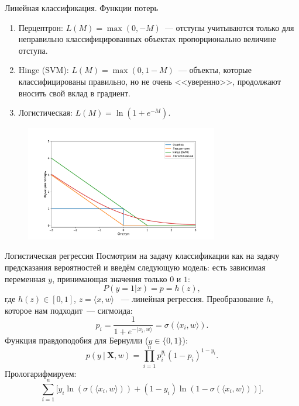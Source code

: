\documentclass[notheorems, handout]{beamer}
\begin{document}
\begin{frame}{Линейная классификация. Функции потерь}
	\begin{enumerate}
		\item Перцептрон: $L(M) = \max(0, -M)$~--- отступы учитываются только для неправильно классифицированных объектах пропорционально величине отступа.
		\item Hinge (SVM): $L(M) = \max(0, 1-M)$~--- объекты, которые классифицированы правильно, но не очень <<уверенно>>, продолжают вносить свой вклад в градиент.
		\item Логистическая: $L(M) = \ln\left(1+e^{-M}\right)$.
	\end{enumerate}
	\begin{figure}
		\includegraphics[width=0.75\textwidth]{img/loss_major.pdf}
	\end{figure}
\end{frame}

\begin{frame}{Логистическая регрессия}
	Посмотрим на задачу классификации как на задачу предсказания вероятностей и введём следующую модель: есть зависимая переменная $y$, принимающая значения только $0$ и $1$:
	\[
		P (y = 1|x) = p = h(z),
	\]
	где $h(z) \in [0, 1]$, $z = \langle x, w\rangle$ ~--- линейная регрессия. Преобразование $h$, которое нам подходит~--- сигмоида:
	\[
		p_i = \frac{1}{1+e^{-\langle x_i, w\rangle}}=\sigma(\langle x_i, w\rangle).
	\]
	Функция правдоподобия для Бернулли ($y \in \{0, 1\}$):
	\[
		p(y~|~\mathbf{X}, w)=\prod_{i=1}^np_i^{y_i}(1-p_i)^{1-y_i}.
	\]
	Прологарифмируем:
	\[
		\sum_{i=1}^n\Big[y_i\ln(\sigma(\langle x_i, w\rangle)) + (1-y_i)\ln(1-\sigma(\langle x_i, w\rangle))\Big].
	\]
\end{frame}
\end{document}
